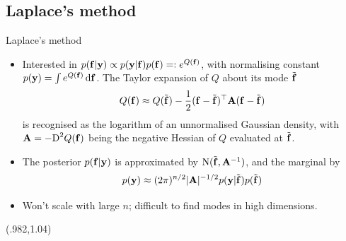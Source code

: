 \subsection{Laplace's method}
\begin{frame}[label=laplace]{Laplace's method}
  \vspace{-15pt}
  \begin{itemize}[<+->]\setlength\itemsep{0.8em}
    \item Interested in $p({\mathbf f}|{\mathbf y}) \propto p({\mathbf y}|{\mathbf f})p({\mathbf f}) =: e^{Q({\mathbf f})}$, with normalising constant $p({\mathbf y}) = \int e^{Q({\mathbf f})} \, \text{d}{\mathbf f}$. The Taylor expansion of $Q$ about its mode $\tilde{{\mathbf f}}$
    \[
      Q({\mathbf f}) \approx Q(\tilde{{\mathbf f}}) - \frac{1}{2} ({\mathbf f} - \tilde{{\mathbf f}})^\top{\mathbf A}({\mathbf f} - \tilde{{\mathbf f}}) 
    \]
    is recognised as the logarithm of an unnormalised Gaussian density, with ${\mathbf A} = -\text{D}^2 Q({\mathbf f})$ being the negative Hessian of $Q$ evaluated at  $\tilde{{\mathbf f}}$.
    \item The posterior $p({\mathbf f}|{\mathbf y})$ is approximated by $\operatorname{N}(\tilde{{\mathbf f}}, {\mathbf A}^{-1})$, and the marginal by
    \[
      p({\mathbf y}) \approx (2\pi)^{n/2} \vert {\mathbf A} \vert^{-1/2}  p({\mathbf y}|\tilde{{\mathbf f}})p(\tilde{{\mathbf f}})
    \]
    \item Won't scale with large $n$; difficult to find modes in high dimensions.
  \end{itemize}
  
  \begin{textblock*}{3cm}(.982\textwidth,1.04\textheight)%
    \hyperlink{estimation}{}      
  \end{textblock*}
\end{frame}

